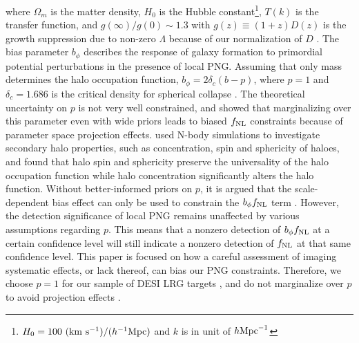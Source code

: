 where $\Omega_{m}$ is the matter density, $H_{0}$ is the Hubble constant\footnote{$H_{0}=100~({\rm km}~{\rm s}^{-1})/(h^{-1}{\rm Mpc})$ and $k$ is in unit of $h {\rm Mpc}^{-1}$}, $T(k)$ is the transfer function, and $g(\infty)/g(0) \sim 1.3$ with $g(z)\equiv (1+z) D(z)$ is the growth suppression due to non-zero $\Lambda$ because of our normalization of $D$ \citep[see, e.g.,][]{2010JCAP...07..013R, 2019MNRAS.485.4160M}. The bias parameter $b_{\phi}$ describes the response of galaxy formation to primordial potential perturbations in the presence of local PNG. Assuming that only mass determines the halo occupation function, $b_{\phi} = 2 \delta_{c}(b - p)$, where $p=1$ and $\delta_{c}= 1.686$ is the critical density for spherical collapse \citep{fillmore1984self}. The theoretical uncertainty on $p$ is not very well constrained, and \cite{2022JCAP...11..013B} showed that marginalizing over this parameter even with wide priors leads to biased $f_{\rm NL}$ constraints because of parameter space projection effects. \cite{2023JCAP...01..023L} used N-body simulations to investigate secondary halo properties, such as concentration, spin and sphericity of haloes, and found that halo spin and sphericity preserve the universality of the halo occupation function while halo concentration significantly alters the halo function. Without better-informed priors on $p$, it is argued that the scale-dependent bias effect can only  be used to constrain the $b_{\phi}f_{\rm NL}$ term \citep[see, e.g.,][]{2020JCAP...12..013B, 2020JCAP...12..031B}. However, the detection significance of local PNG remains unaffected by various assumptions regarding $p$. This means that a nonzero detection of $b_{\phi}f_{\rm NL}$ at a certain confidence level will still indicate a nonzero detection of $f_{\rm NL}$ at that same confidence level. This paper is focused on how a careful assessment of imaging systematic effects, or lack thereof, can bias our PNG constraints. Therefore, we choose $p=1$ for our sample of DESI LRG targets \citep[see, also,][]{slosar2008constraints,2010JCAP...07..013R,2013MNRAS.428.1116R}, and do not marginalize over $p$ to avoid projection effects \citep{2022JCAP...11..013B}.

